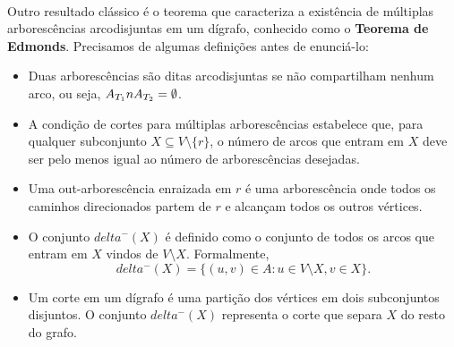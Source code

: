 \documentclass[12pt,a4paper]{article}
\def\emph#1{#1}%
\def\cap{\string n}%
\def\delta{delta}%
\begin{document}
\paragraph{}
Outro resultado clássico é o teorema que caracteriza a existência de múltiplas arborescências arcodisjuntas em um dígrafo, conhecido como o \textbf{Teorema de Edmonds}. Precisamos de algumas definições antes de enunciá-lo:

\begin{itemize}
    \item Duas arborescências são ditas \emph{arcodisjuntas} se não compartilham nenhum arco, ou seja, \(A_{T_1} \cap A_{T_2} = \emptyset\).
    \item A condição de cortes para múltiplas arborescências estabelece que, para qualquer subconjunto \(X \subseteq V \setminus \{r\}\), o número de arcos que entram em \(X\) deve ser pelo menos igual ao número de arborescências desejadas.
    \item Uma out-arborescência enraizada em \(r\) é uma arborescência onde todos os caminhos direcionados partem de \(r\) e alcançam todos os outros vértices.
    \item O conjunto \(\delta^-(X)\) é definido como o conjunto de todos os arcos que entram em \(X\) vindos de \(V \setminus X\). Formalmente,
          \[
              \delta^-(X) = \{(u, v) \in A : u \in V \setminus X, v \in X\}.
          \]
    \item Um corte em um dígrafo é uma partição dos vértices em dois subconjuntos disjuntos. O conjunto \(\delta^-(X)\) representa o corte que separa \(X\) do resto do grafo.
\end{itemize}
\end{document}
